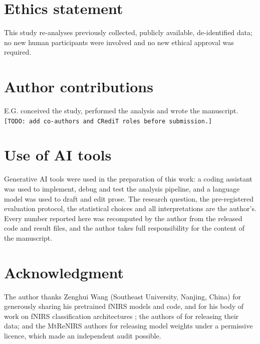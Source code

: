 \section*{Ethics statement}
This study re-analyses previously collected, publicly available, de-identified data; no new human
participants were involved and no new ethical approval was required.

\section*{Author contributions}
E.G. conceived the study, performed the analysis and wrote the manuscript.
\texttt{[TODO: add co-authors and CRediT roles before submission.]}

\section*{Use of AI tools}
Generative AI tools were used in the preparation of this work: a coding assistant was used to
implement, debug and test the analysis pipeline, and a language model was used to draft and edit
prose. The research question, the pre-registered evaluation protocol, the statistical choices and
all interpretations are the author's. Every number reported here was recomputed by the author
from the released code and result files, and the author takes full responsibility for the content
of the manuscript.

\section*{Acknowledgment}
The author thanks Zenghui Wang (Southeast University, Nanjing, China) for generously sharing his
pretrained fNIRS models and code, and for his body of work on fNIRS classification architectures
\citep{wang2022vision,wang2022transformer,wang2023rethinking,wang2026unified,wang2026dkssm};
the authors of \citet{luke2021passive} for releasing their data; and the MtReNIRS authors for
releasing model weights under a permissive licence, which made an independent audit possible.
